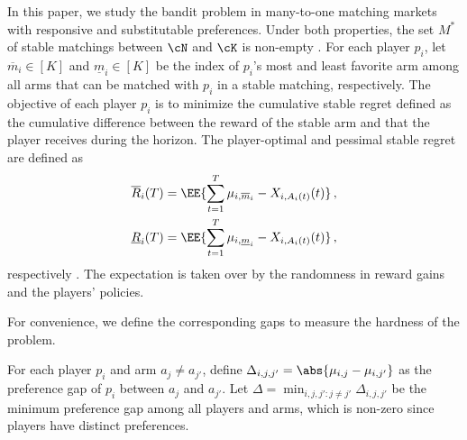 In this paper, we study the bandit problem in many-to-one matching markets with responsive and substitutable preferences. Under both properties, the set $M^*$ of stable matchings between $\cN$ and $\cK$ is non-empty \citep{roth1992two,kelso1982job}. 
For each player $p_i$, let $\overline{m}_i\in[K]$ and $\underline{m}_i\in[K]$ be the index of $p_i$'s most and least favorite arm among all arms that can be matched with $p_i$ in a stable matching, respectively.
The objective of each player $p_i$ is to minimize the cumulative stable regret defined as the cumulative difference between the reward of the stable arm and that the player receives during the horizon. The player-optimal and pessimal stable regret are defined as
\begin{align}
\overline{R}_i(T) = \EE{\sum_{t=1}^T \mu_{i,\overline{m}_i} - X_{i,A_i(t)}(t)} \,,\\
\underline{R}_i(T) = \EE{\sum_{t=1}^T \mu_{i,\underline{m}_i} - X_{i,A_i(t)}(t)} \,,
\end{align}
respectively \citep{liu2020competing,liu2021bandit,kong2022thompson,wang2022bandit,zhang2022matching,kong2023player}. The expectation is taken over by the randomness in reward gains and the players' policies. 

For convenience, we define the corresponding gaps to measure the hardness of the problem. 

\begin{definition}\label{def:gap}
    For each player $p_i$ and arm $a_j \neq a_{j'}$, define $\Delta_{i,j,j'} = \abs{\mu_{i,j}-\mu_{i,j'}}$ as the preference gap of $p_i$ between $a_j$ and $a_{j'}$. Let $\Delta = \min_{i,j,j':j\neq j'}\Delta_{i,j,j'}$ be the minimum preference gap among all players and arms, which is non-zero since players have distinct preferences. 
\end{definition}
